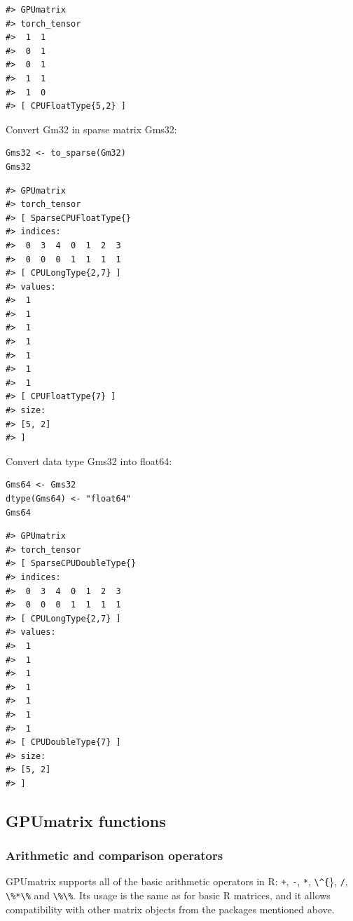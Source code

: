 \begin{verbatim}
#> GPUmatrix
#> torch_tensor
#>  1  1
#>  0  1
#>  0  1
#>  1  1
#>  1  0
#> [ CPUFloatType{5,2} ]
\end{verbatim}

Convert Gm32 in sparse matrix Gms32:

\begin{verbatim}
Gms32 <- to_sparse(Gm32)
Gms32
\end{verbatim}

\begin{verbatim}
#> GPUmatrix
#> torch_tensor
#> [ SparseCPUFloatType{}
#> indices:
#>  0  3  4  0  1  2  3
#>  0  0  0  1  1  1  1
#> [ CPULongType{2,7} ]
#> values:
#>  1
#>  1
#>  1
#>  1
#>  1
#>  1
#>  1
#> [ CPUFloatType{7} ]
#> size:
#> [5, 2]
#> ]
\end{verbatim}

Convert data type Gms32 into float64:

\begin{verbatim}
Gms64 <- Gms32
dtype(Gms64) <- "float64"
Gms64
\end{verbatim}

\begin{verbatim}
#> GPUmatrix
#> torch_tensor
#> [ SparseCPUDoubleType{}
#> indices:
#>  0  3  4  0  1  2  3
#>  0  0  0  1  1  1  1
#> [ CPULongType{2,7} ]
#> values:
#>  1
#>  1
#>  1
#>  1
#>  1
#>  1
#>  1
#> [ CPUDoubleType{7} ]
#> size:
#> [5, 2]
#> ]
\end{verbatim}

\hypertarget{gpumatrix-functions}{%
\subsection{GPUmatrix functions}\label{gpumatrix-functions}}

\hypertarget{arithmetic-and-comparison-operators}{%
\subsubsection{Arithmetic and comparison operators}\label{arithmetic-and-comparison-operators}}

GPUmatrix supports all of the basic arithmetic operators in R: \texttt{+}, \texttt{-}, \texttt{*}, \texttt{\textbackslash{}\^{}\{}\}, \texttt{/}, \texttt{\textbackslash{}\%*\textbackslash{}\%} and \texttt{\textbackslash{}\%\textbackslash{}\%}. Its usage is the same as for basic R matrices, and it allows compatibility with other matrix objects from the packages mentioned above.

